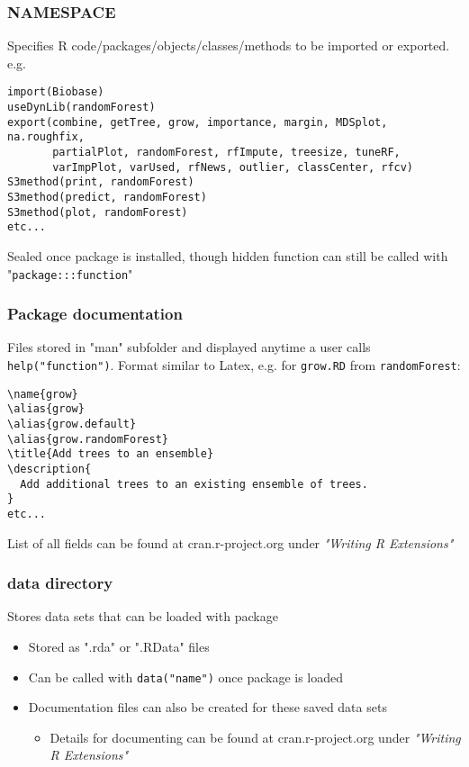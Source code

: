 \documentclass{beamer}
\begin{document}
\begin{frame}[fragile]
\frametitle{NAMESPACE}
Specifies R code/packages/objects/classes/methods to be imported or exported. e.g.
\begin{verbatim}
import(Biobase)
useDynLib(randomForest)
export(combine, getTree, grow, importance, margin, MDSplot, na.roughfix,
       partialPlot, randomForest, rfImpute, treesize, tuneRF,
       varImpPlot, varUsed, rfNews, outlier, classCenter, rfcv)
S3method(print, randomForest)
S3method(predict, randomForest)
S3method(plot, randomForest)
etc...
\end{verbatim}
Sealed once package is installed, though hidden function can still be called with "\texttt{package:::function}"
\end{frame}


\begin{frame}[fragile]
\frametitle{Package documentation}
Files stored in "man" subfolder and displayed anytime a user calls \texttt{help("function")}. Format similar to Latex, e.g. for \texttt{grow.RD} from \texttt{randomForest}:
\begin{verbatim}
\name{grow}
\alias{grow}
\alias{grow.default}
\alias{grow.randomForest}
\title{Add trees to an ensemble}
\description{
  Add additional trees to an existing ensemble of trees.
}
etc...
\end{verbatim}
List of all fields can be found at cran.r-project.org under \it{"Writing R Extensions"}
\end{frame}


\begin{frame}
\frametitle{data directory}
Stores data sets that can be loaded with package
\begin{itemize}
  \item Stored as ".rda" or ".RData" files
  \item Can be called with \texttt{data("name")} once package is loaded
  \item Documentation files can also be created for these saved data sets
  \begin{itemize}
  	\item Details for documenting can be found at cran.r-project.org under \it{"Writing R Extensions"}
  \end{itemize}
\end{itemize}
\end{frame}
\end{document}
